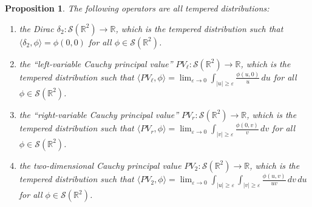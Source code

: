 \documentclass[11pt]{article}
\theoremstyle{plain}
\newtheorem{prop}[thm]{Proposition}
\theoremstyle{definition}
\numberwithin{equation}{section}
\newcommand{\R}{\mathbb R}
\newcommand{\0}{{\vec 0}}
\begin{document}
\begin{prop} \label{singular tempered}
The following operators are all tempered distributions:
\begin{enumerate}[label={\rm(\alph*)},itemsep=0pt]
\item the Dirac $\delta_2\colon\mathcal{S}(\R^2)\rightarrow \R$, which is the tempered distribution such that $\langle \delta_2,\phi \rangle=\phi(0,0)$ for all $\phi\in \mathcal{S}(\R^2)$.
\item the ``left-variable Cauchy principal value'' $PV_\ell\colon\mathcal{S}(\R^2)\rightarrow \R$, which is the tempered distribution such that $\langle PV_\ell,\phi \rangle=\lim_{\varepsilon\rightarrow 0}\int_{|u|\ge \varepsilon}\frac{\phi(u,0)}{u}\,du$ for all $\phi\in \mathcal{S}(\R^2)$.
\item the ``right-variable Cauchy principal value'' $PV_r\colon\mathcal{S}(\R^2)\rightarrow \R$, which is the tempered distribution such that $\langle PV_r,\phi \rangle=\lim_{\varepsilon\rightarrow 0}\int_{|v|\ge \varepsilon}\frac{\phi(0,v)}{v}\,dv$ for all $\phi\in \mathcal{S}(\R^2)$.
\item the two-dimensional Cauchy principal value $PV_2\colon\mathcal{S}(\R^2)\rightarrow \R$, which is the tempered distribution such that $\langle PV_2,\phi \rangle=\lim_{\varepsilon\rightarrow 0}\int_{|u|\ge \varepsilon}\int_{|v|\ge \varepsilon}\frac{\phi(u,v)}{uv}\,dv\,du$ for all $\phi\in \mathcal{S}(\R^2)$.
\end{enumerate}
\end{prop}
\end{document}
